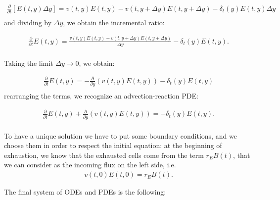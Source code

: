 \documentclass[12pt,a4paper]{article}
\begin{document}
\begin{equation}
\begin{aligned}
\frac{\partial}{\partial t}[E(t,y) \Delta y] = v(t,y)E(t,y)-v(t,y+\Delta y)E(t,y+\Delta y)-\delta_t(y) E(t,y)\Delta y \\
\end{aligned}
\end{equation}
and dividing by $\Delta y$, we obtain the incremental ratio:

\begin{equation}
\begin{aligned}
\frac{\partial}{\partial t}E(t,y)= \frac{v(t,y)E(t,y)-v(t,y+\Delta y)E(t,y+\Delta y)}{\Delta y}-\delta_t(y) E(t,y). \\
\end{aligned}
\end{equation}

Taking the limit $\Delta y\rightarrow0$, we obtain:

\begin{equation}
\begin{aligned}
\frac{\partial}{\partial t}E(t,y)= -\frac{\partial}{\partial y}(v(t,y)E(t,y))-\delta_t(y) E(t,y) \\
\end{aligned}
\end{equation}
rearranging the terms, we recognize an advection-reaction PDE:

\begin{equation}
\begin{aligned}
\frac{\partial}{\partial t}E(t,y) +\frac{\partial}{\partial y}(v(t,y)E(t,y))=-\delta_t(y) E(t,y). \\
\end{aligned}
\end{equation}

To have a unique solution we have to put some boundary conditions, and we choose them in order to respect the initial equation: at the beginning of exhaustion, we know that the exhausted cells come from the term $r_E B(t)$, that we can consider as the incoming flux on the left side, i.e. 
\begin{equation}
\begin{aligned}
v(t,0)E(t,0)=r_E B(t).
\end{aligned}
\end{equation}

The final system of ODEs and PDEs is the following:
\end{document}
